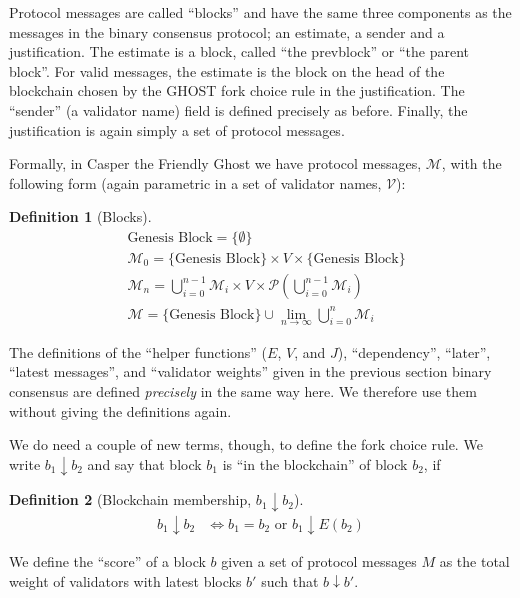 \documentclass{article}
\theoremstyle{definition}
\newtheorem{defn}{Definition}[section]
\begin{document}
Protocol messages are called ``blocks'' and have the same three components as the messages in the binary consensus protocol; an estimate, a sender and a justification. The estimate is a block, called ``the prevblock'' or ``the parent block''. For valid messages, the estimate is the block on the head of the blockchain chosen by the GHOST fork choice rule in the justification. The ``sender'' (a validator name) field is defined precisely as before. Finally, the justification is again simply a set of protocol messages.

Formally, in Casper the Friendly Ghost we have protocol messages, $\mathcal{M}$, with the following form (again parametric in a set of validator names, $\mathcal{V}$):


\begin{defn}[Blocks]
\begin{equation*}
\begin{split}
  &\text{Genesis Block} = \{\emptyset\}\\
    &\mathcal{M}_0 = \{\text{Genesis Block}\} \times V \times \{\text{Genesis Block}\}\\
    &\mathcal{M}_n = \bigcup_{i=0}^{n-1} \mathcal{M}_i \times V \times \mathcal{P}(\bigcup_{i=0}^{n-1} \mathcal{M}_i)\\
    &\mathcal{M} = \{\text{Genesis Block}\} \cup \lim_{n \to \infty} \bigcup_{i=0}^{n} \mathcal{M}_i
\end{split}
\end{equation*}
\end{defn}

The definitions of the ``helper functions'' ($E$, $V$, and $J$), ``dependency'', ``later'', ``latest messages'', and ``validator weights'' given in the previous section binary consensus are defined \emph{precisely} in the same way here. We therefore use them without giving the definitions again.

We do need a couple of new terms, though, to define the fork choice rule. We write $b_1 \downarrow b_2$ and say that block $b_1$ is ``in the blockchain'' of block $b_2$, if

\begin{defn}[Blockchain membership, $b_1 \downarrow b_2$]
\begin{align}
  b_1 \downarrow b_2 &\iff b_1 = b_2 \text{ or } b_1 \downarrow E(b_2)
\end{align}
\end{defn}

We define the ``score'' of a block $b$ given a set of protocol messages $M$ as the total weight of validators with latest blocks $b'$ such that $b \downarrow b'$.
\end{document}
